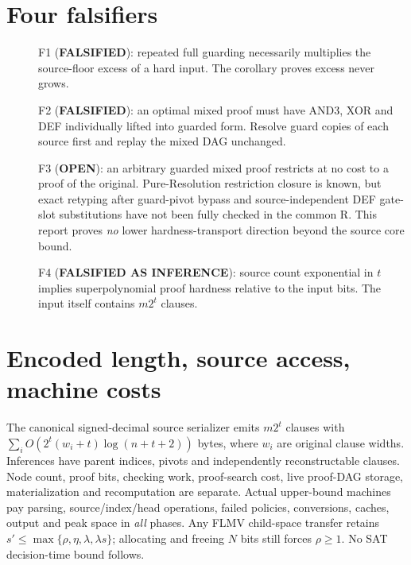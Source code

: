 \documentclass[11pt]{article}
\begin{document}
\section*{Four falsifiers}
\begin{description}
\item[] F1 (\textbf{FALSIFIED}): repeated full guarding necessarily multiplies the source-floor excess of a hard input. The corollary proves excess never grows.
\item[] F2 (\textbf{FALSIFIED}): an optimal mixed proof must have AND3, XOR and DEF individually lifted into guarded form. Resolve guard copies of each source first and replay the mixed DAG unchanged.
\item[] F3 (\textbf{OPEN}): an arbitrary guarded mixed proof restricts at no cost to a proof of the original. Pure-Resolution restriction closure is known, but exact retyping after guard-pivot bypass and source-independent DEF gate-slot substitutions have not been fully checked in the common R. This report proves \emph{no} lower hardness-transport direction beyond the source core bound.
\item[] F4 (\textbf{FALSIFIED AS INFERENCE}): source count exponential in $t$ implies superpolynomial proof hardness relative to the input bits. The input itself contains $m2^t$ clauses.
\end{description}
\section*{Encoded length, source access, machine costs}
The canonical signed-decimal source serializer emits $m2^t$ clauses with $\sum_i O(2^t(w_i+t)\log(n+t+2))$ bytes, where $w_i$ are original clause widths. Inferences have parent indices, pivots and independently reconstructable clauses. Node count, proof bits, checking work, proof-search cost, live proof-DAG storage, materialization and recomputation are separate. Actual upper-bound machines pay parsing, source/index/head operations, failed policies, conversions, caches, output and peak space in \emph{all} phases. Any FLMV child-space transfer retains $s'\le\max\{\rho,\eta,\lambda,\lambda s\}$; allocating and freeing $N$ bits still forces $\rho\ge1$. No SAT decision-time bound follows.
\end{document}
